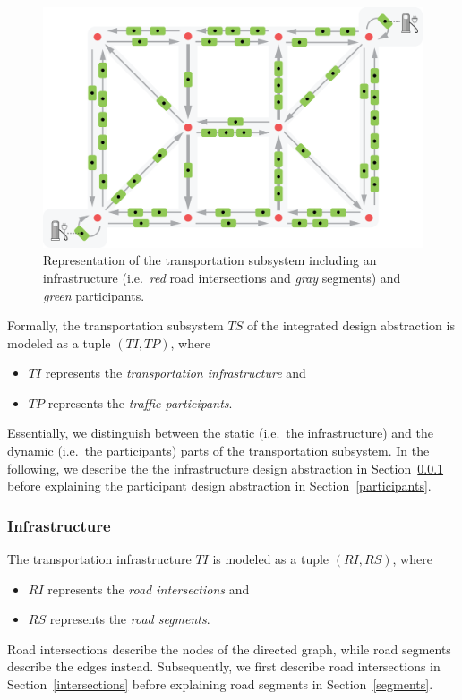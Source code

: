 \begin{figure}[h]
	\begin{center}
	\includegraphics[trim=0 6 0 21, width=.9\columnwidth]{./gfx/transportation_system.png}
	\caption{Representation of the transportation subsystem including an infrastructure (i.e.\ \textit{red} road intersections and \textit{gray} segments) and \textit{green} participants.}
	\label{transport_illustration}
	\end{center}
\end{figure}

Formally, the transportation subsystem $TS$ of the integrated design abstraction is modeled as a tuple $(TI, TP)$, where
\begin{itemize}
	\item $TI$ represents the \textit{transportation infrastructure} and
	\item $TP$ represents the \textit{traffic participants}.
\end{itemize}
Essentially, we distinguish between the static (i.e.\ the infrastructure) and the dynamic (i.e.\ the participants) parts of the transportation subsystem. In the following, we describe the the infrastructure design abstraction in Section~\ref{transport_infrastructure} before explaining the participant design abstraction in Section~\ref{participants}.

\subsubsection{Infrastructure}
\label{transport_infrastructure}

The transportation infrastructure $TI$ is modeled as a tuple $(RI, RS)$, where
\begin{itemize}
	\item $RI$ represents the \textit{road intersections} and
	\item $RS$ represents the \textit{road segments}.
\end{itemize}
Road intersections describe the nodes of the directed graph, while road segments describe the edges instead. Subsequently, we first describe road intersections in Section~\ref{intersections} before explaining road segments in Section~\ref{segments}.

